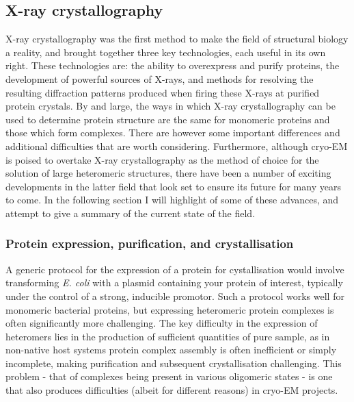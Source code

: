 \documentclass[a4paper,11pt,twoside,openright]{scrbook}
\begin{document}
\subsection{X-ray crystallography}
X-ray crystallography was the first method to make the field of structural biology a reality, and brought together three key technologies, each useful in its own right. These technologies are: the ability to overexpress and purify proteins, the development of powerful sources of X-rays, and methods for resolving the resulting diffraction patterns produced when firing these X-rays at purified protein crystals. By and large, the ways in which X-ray crystallography can be used to determine protein structure are the same for monomeric proteins and those which form complexes. There are however some important differences and additional difficulties that are worth considering. Furthermore, although cryo-EM is poised to overtake X-ray crystallography as the method of choice for the solution of large heteromeric structures, there have been a number of exciting developments in the latter field that look set to ensure its future for many years to come. In the following section I will highlight of some of these advances, and attempt to give a summary of the current state of the field.

\subsubsection{Protein expression, purification, and crystallisation}
A generic protocol for the expression of a protein for cystallisation would involve transforming \textit{E. coli} with a plasmid containing your protein of interest, typically under the control of a strong, inducible promotor. Such a protocol works well for monomeric bacterial proteins, but expressing heteromeric protein complexes is often significantly more challenging. The key difficulty in the expression of heteromers lies in the production of sufficient quantities of pure sample, as in non-native host systems protein complex assembly is often inefficient or simply incomplete, making purification and subsequent crystallisation challenging. This problem - that of complexes being present in various oligomeric states - is one that also produces difficulties (albeit for different reasons) in cryo-EM projects.
\end{document}
